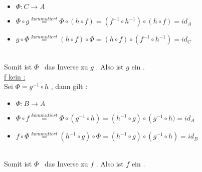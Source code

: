 		\begin{itemize}
			\item 
				\begin{math}
					\Phi : C \to A
				\end{math}
			\item
				\begin{math}
					\Phi \circ g \overset{ kommutiert}{=}
					\Phi \circ \left( 
						h \circ f  
						\right) =
					\left( f^{-1} \circ h^{-1} \right) 
					\circ 
					\left( h \circ f  \right)= 
					id_{A}
				\end{math}
			\item
				\begin{math}
					g \circ \Phi \overset{ kommutiert}{=}
					\left( 
						h \circ f
 						\right) \circ \Phi =
					\left( h \circ f  \right)
					\circ
					\left( f^{-1} \circ h^{-1} \right)=
					id_{C}
				\end{math}
		\end{itemize}
		\\
		Somit ist 
		\begin{math}
			\Phi
		\end{math}
		\ das Inverse zu 
		\begin{math}
			g
		\end{math}
		. 
		Also ist 
		\begin{math}

			g
		\end{math}
		ein \Iso. 
		\\
		\underline {f kein \Iso :}
		\\
		Sei 
		\begin{math}
			\Phi=g^{-1} \circ h
		\end{math}		
		, dann gilt :
		\begin{itemize}
			\item 
				\begin{math}
					\Phi : B \to A
				\end{math}
			\item
				\begin{math}
					\Phi \circ f \overset{ kommutiert}{=}
					\Phi \circ \left( 
						g^{-1} \circ h  
						\right) =
					\left(  h^{-1} \circ g \right) 
					\circ 
					\left( g^{-1} \circ h )= 
					id_{A}
				\end{math}
			\item
				\begin{math}
					f \circ \Phi \overset{ kommutiert}{=}
					\left( 
						h^{-1} \circ g
 						\right) \circ \Phi =
					\left(h^{-1} \circ g \right)
					\circ
					\left( g^{-1} \circ h  \right)=
					id_{B}
				\end{math}
		\end{itemize}
		\\
		Somit ist 
		\begin{math}
			\Phi
		\end{math}
		\ das Inverse zu 
		\begin{math}
			f
		\end{math}
		. 
		Also ist 
		\begin{math}
			f
		\end{math}
		ein \Iso. 
		\\		
